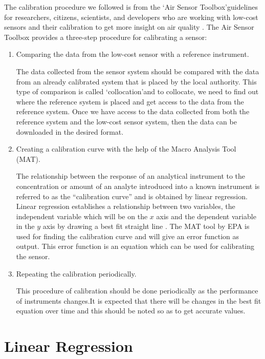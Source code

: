 The calibration procedure we followed is from the \lq{Air Sensor Toolbox}\rq  guidelines for researchers, citizens, scientists, and developers who are working with low-cost sensors and their calibration to get more insight on air quality \cite{airsensortoolbox}. The Air Sensor Toolbox \cite{airsensorguidebook} provides a three-step procedure for calibrating a sensor:
\begin{enumerate}
    \item Comparing the data from the low-cost sensor with a reference instrument.
    
The data collected from the sensor system should be compared with the data from an already calibrated system that is placed by the local authority. This type of comparison is called  \lq{collocation}\rq and to collocate, we need to find out where the reference system is placed and get access to the data from the reference system. Once we have access to the data collected from both the reference system and the low-cost sensor system, then the data can be downloaded in the desired format.

    \item Creating a calibration curve with the help of the Macro Analysis Tool (MAT).

The relationship between the response of an analytical instrument to the concentration or amount of an analyte introduced into a known instrument is referred to as the “calibration curve” \cite{Epa2010} and is obtained by linear regression. Linear regression establishes a relationship between two variables, the independent variable which will be on the $x$ axis and the dependent variable in the $y$ axis by drawing a best fit straight line \cite{regression}. The MAT tool by EPA is used for finding the calibration curve and will give an error function as output. This error function is an equation which can be used for calibrating the sensor.
    \item Repeating the calibration periodically.

    This procedure of calibration should be done periodically as the performance of instruments changes.It is expected that there will be changes in the best fit equation over time and this should be noted so as to get accurate values.
\end{enumerate} 


\iffalse

\section{Linear Regression}

